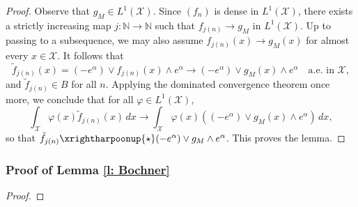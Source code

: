 \documentclass[a4paper, 11pt]{article}
\theoremstyle{definition}
\newcommand{\cX}{{\mathcal{X}}}
\begin{document}
{\begin{proof}
Observe that \( g_M \in L^1(\cX) \). Since \( (f_n) \) is dense in \( L^1(\cX) \), there exists a strictly increasing map \( j : \mathbb{N} \to \mathbb{N} \) such that \( f_{j(n)} \to g_M \) in \( L^1(\cX) \). Up to passing to a subsequence, we may also assume \( f_{j(n)}(x) \to g_M(x) \) for almost every \( x \in \cX \). %
It follows that
\[
\tilde{f}_{j(n)}(x) = (-e^\alpha) \lor f_{j(n)}(x) \land e^\alpha \to (-e^\alpha)\vee g_M(x) \wedge e^\alpha  \quad \text{a.e. in } \cX,
\]
and \( \tilde{f}_{j(n)} \in B \) for all \( n \). Applying the dominated convergence theorem once more, we conclude that for all \( \varphi \in L^1(\cX) \),
\[
\int_{\cX} \varphi(x) \tilde{f}_{j(n)}(x) \, dx \to \int_{\cX} \varphi(x)  \left( (-e^\alpha)\vee g_M(x) \wedge e^\alpha \right) \, dx,
\]
so that \( \tilde{f}_{j(n)} \xrightharpoonup{\star}  (-e^\alpha)\vee g_M \wedge e^\alpha \). This proves the lemma.  
\end{proof}


\subsubsection{Proof of Lemma \ref{l: Bochner}}
\begin{proof}


\end{proof}}
\end{document}
